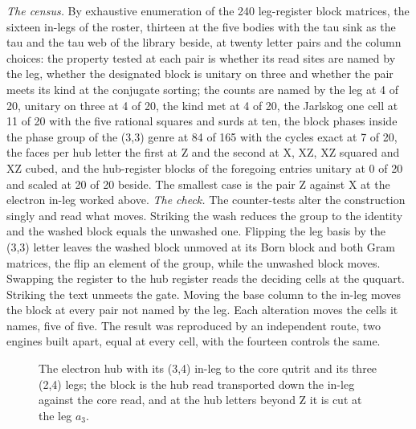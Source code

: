 \begin{chproof}
\textit{The census.} By exhaustive enumeration of the 240 leg-register block matrices, the sixteen in-legs of the roster, thirteen at the five bodies with the tau sink as the tau and the tau web of the library beside, at twenty letter pairs and the column choices: the property tested at each pair is whether its read sites are named by the leg, whether the designated block is unitary on three and whether the pair meets its kind at the conjugate sorting; the counts are named by the leg at 4 of 20, unitary on three at 4 of 20, the kind met at 4 of 20, the Jarlskog one cell at 11 of 20 with the five rational squares and surds at ten, the block phases inside the phase group of the (3,3) genre at 84 of 165 with the cycles exact at 7 of 20, the faces per hub letter the first at Z and the second at X, XZ, XZ squared and XZ cubed, and the hub-register blocks of the foregoing entries unitary at 0 of 20 and scaled at 20 of 20 beside. The smallest case is the pair Z against X at the electron in-leg worked above.
\textit{The check.} The counter-tests alter the construction singly and read what moves. Striking the wash reduces the group to the identity and the washed block equals the unwashed one. Flipping the leg basis by the (3,3) letter leaves the washed block unmoved at its Born block and both Gram matrices, the flip an element of the group, while the unwashed block moves. Swapping the register to the hub register reads the deciding cells at the ququart. Striking the text unmeets the gate. Moving the base column to the in-leg moves the block at every pair not named by the leg. Each alteration moves the cells it names, five of five. The result was reproduced by an independent route, two engines built apart, equal at every cell, with the fourteen controls the same.
\begin{figure}[h]\centering{}\caption{The electron hub with its (3,4) in-leg to the core qutrit and its three (2,4) legs; the block is the hub read transported down the in-leg against the core read, and at the hub letters beyond Z it is cut at the leg $a_3$.}\end{figure}
\end{chproof}
